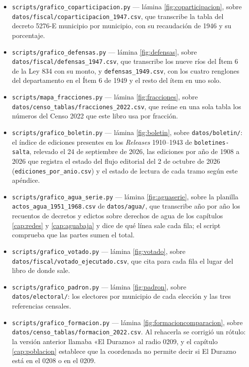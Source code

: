 \begin{itemize}[leftmargin=*,nosep]
\item \texttt{scripts/grafico\_coparticipacion.py}
--- lámina \ref{fig:coparticipacion}, sobre
\texttt{datos/fiscal/}\allowbreak\texttt{coparticipacion\_1947.csv}, que transcribe la tabla del
decreto 5276-E municipio por municipio, con su recaudación de 1946 y su porcentaje.
\item \texttt{scripts/grafico\_defensas.py} --- lámina \ref{fig:defensas}, sobre \texttt{datos/fiscal/defensas\_1947.csv}, que transcribe los nueve ríos del Ítem 6 de la Ley 834 con su monto, y \texttt{defensas\_1949.csv}, con los cuatro renglones del departamento en el Ítem 6 de 1949 y el resto del ítem en uno solo.
\item \texttt{scripts/mapa\_fracciones.py} --- lámina \ref{fig:fracciones}, sobre \texttt{datos/censo\_tablas/fracciones\_2022.csv}, que reúne en una sola tabla los números del Censo 2022 que este libro usa por fracción.
\item \texttt{scripts/grafico\_boletin.py} --- lámina \ref{fig:boletin}, sobre \texttt{datos/boletin/}: el índice de ediciones presentes en los \textit{Releases} 1910--1943 de \texttt{boletines-salta}, relevado el 24 de septiembre de 2026, las ediciones por año de 1908 a 2026 que registra el estado del flujo editorial del 2 de octubre de 2026 (\texttt{ediciones\_por\_anio.csv}) y el estado de lectura de cada tramo según este apéndice.
\item \texttt{scripts/grafico\_agua\_serie.py} --- lámina \ref{fig:aguaserie}, sobre la planilla \texttt{actos\_agua\_}\allowbreak\texttt{1951\_1968.csv} de \texttt{datos/agua/}, que transcribe año por año los recuentos de decretos y edictos sobre derechos de agua de los capítulos \ref{cap:redes} y \ref{cap:aguabaja} y dice de qué línea sale cada fila; el script comprueba que las partes sumen el total.
\item \texttt{scripts/grafico\_votado.py} --- lámina \ref{fig:votado}, sobre \texttt{datos/fiscal/votado\_ejecutado.csv}, que cita para cada fila el lugar del libro de donde sale.
\item \texttt{scripts/grafico\_padron.py} --- lámina \ref{fig:padron}, sobre \texttt{datos/electoral/}: los electores por municipio de cada elección y las tres referencias censales.
\item \texttt{scripts/grafico\_formacion.py} --- lámina \ref{fig:formacioncomparacion}, sobre \texttt{datos/censo\_tablas/formacion\_2022.csv}. Al rehacerla se corrigió un rótulo: la versión anterior llamaba «El Durazno» al radio 0209, y el capítulo \ref{cap:poblacion} establece que la coordenada no permite decir si El Durazno está en el 0208 o en el 0209.

\end{itemize}
